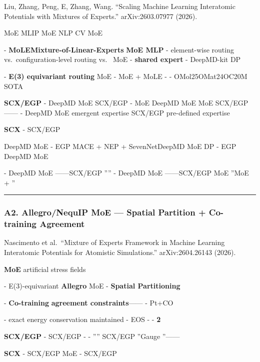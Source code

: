 \documentclass[
  12pt,
]{article}
\begin{document}
\textbf{} Liu, Zhang, Peng, E, Zhang, Wang. ``Scaling Machine
Learning Interatomic Potentials with Mixtures of Experts.''
arXiv:2603.07977 (2026).

\textbf{}  MoE  MLIP  MoE 
NLP  CV  MoE


\textbf{} -
\textbf{MoLEMixture-of-Linear-Experts} 
\textbf{MoE MLP } -
\textbf{}element-wise routing
vs.~configuration-level routing vs.~ MoE  -
\textbf{shared expert}  -  DeepMD-kit
 DP 

\textbf{} - \textbf{E(3) equivariant
routing} MoE  - 
MoE +  MoLE -
\textbf{}
-  OMol25OMat24OC20M  SOTA

\textbf{ SCX/EGP } - \textbf{} DeepMD MoE 
SCX/EGP  -  MoE
DeepMD MoE \textbf{} MoE
 SCX/EGP
\textbf{}------ -
DeepMD MoE emergent expertise SCX/EGP
pre-defined expertise

\textbf{SCX } - \textbf{} SCX/EGP

DeepMD MoE  - \textbf{}
EGP MACE + NEP + SevenNetDeepMD MoE
 DP  - \textbf{} EGP
DeepMD MoE 

\textbf{} - DeepMD MoE
\textbf{}------SCX/EGP
'''' - DeepMD MoE
------SCX/EGP  MoE ''MoE  +
''

\begin{center}\rule{0.5\linewidth}{0.5pt}\end{center}

\subsubsection{A2. Allegro/NequIP MoE --- Spatial Partition +
Co-training
Agreement}\label{a2.-allegronequip-moe-spatial-partition-co-training-agreement}

\textbf{} Nascimento et al.~``Mixture of Experts Framework in
Machine Learning Interatomic Potentials for Atomistic Simulations.''
arXiv:2604.26143 (2026).

\textbf{} \textbf{ MoE}
artificial stress
fields

\textbf{} -  E(3)-equivariant \textbf{Allegro}
 MoE  - \textbf{Spatial Partitioning}

- \textbf{Co-training}
\textbf{agreement
constraints}------
- Pt+CO 

\textbf{} - exact energy conservation maintained -
EOS -  -
\textbf{ 2 }

\textbf{ SCX/EGP } - \textbf{}
\textbf{}SCX/EGP
\textbf{} -
\textbf{}
- '''' SCX/EGP ''Gauge
''------

\textbf{SCX } - SCX/EGP
\textbf{}
MoE  - SCX/EGP
\end{document}
